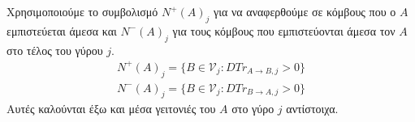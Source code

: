 {}
\begin{definition}[Γειτονιά]
  \label{neighbourhood}
  Χρησιμοποιούμε το συμβολισμό $N^{+}\left(A\right)_j$ για να αναφερθούμε σε κόμβους που ο $A$ εμπιστεύεται άμεσα και
  $N^{-}\left(A\right)_j$ για τους κόμβους που εμπιστεύονται άμεσα τον $A$ στο τέλος του γύρου $j$.
  \begin{equation}
  \begin{gathered}
    N^{+}\left(A\right)_j = \{B \in \mathcal{V}_j : DTr_{A \rightarrow B, j} > 0\} \\
    N^{-}\left(A\right)_j = \{B \in \mathcal{V}_j : DTr_{B \rightarrow A, j} > 0\}
  \end{gathered}
  \end{equation}
  Αυτές καλούνται έξω και μέσα γειτονιές του $A$ στο γύρο $j$ αντίστοιχα.
\end{definition}
